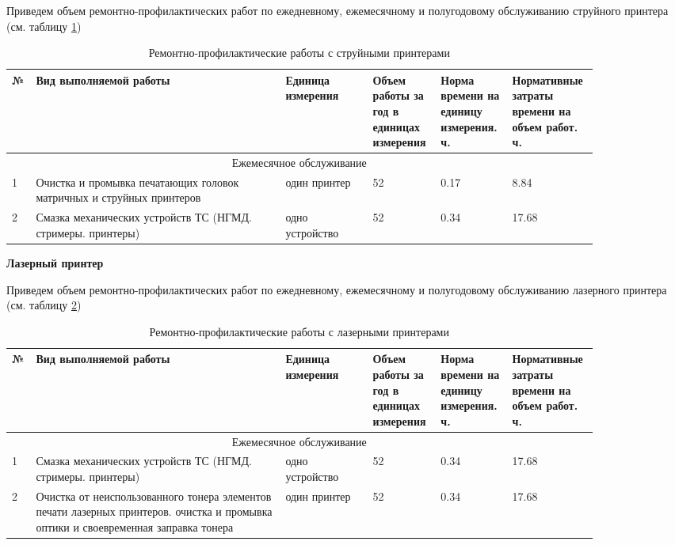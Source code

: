 \documentclass[a4paper,14pt]{extarticle}
\begin{document}
Приведем объем ремонтно-профилактических работ по ежедневному, ежемесячному и полугодовому обслуживанию струйного принтера (см. таблицу \ref{tab:ink})
\begin{table}[h!]
	\scriptsize
	\caption{Ремонтно-профилактические работы с струйными принтерами}
	\begin{tabular}{|m{0.02\linewidth}|m{0.4\linewidth}|m{0.14\linewidth}|m{0.1\linewidth}|m{0.1\linewidth}|m{0.1\linewidth}|}
		\hline
		№ & Вид выполняемой работы & Единица измерения & Объем работы за год в единицах измерения & Норма времени на единицу измерения. ч.& Нормативные затраты времени на объем работ. ч. \\\hline
		
		\multicolumn{6}{|c|}{Ежемесячное обслуживание} \\ \hline
		
		1	&Очистка и промывка печатающих головок матричных и струйных принтеров&	один принтер&	52&	0.17&	8.84
		\\ \hline
		2&	Смазка механических устройств ТС (НГМД. стримеры. принтеры)	&одно устройство&	52	&0.34&	17.68
	\\ \hline
	\end{tabular}
	\label{tab:ink}
\end{table}


\textbf{Лазерный принтер}

Приведем объем ремонтно-профилактических работ по ежедневному, ежемесячному и полугодовому обслуживанию лазерного принтера (см. таблицу \ref{tab:jet})
\begin{table}[h!]
	\scriptsize
	\caption{Ремонтно-профилактические работы с лазерными принтерами}
	\begin{tabular}{|m{0.02\linewidth}|m{0.4\linewidth}|m{0.14\linewidth}|m{0.1\linewidth}|m{0.1\linewidth}|m{0.1\linewidth}|}
		\hline
		№ & Вид выполняемой работы & Единица измерения & Объем работы за год в единицах измерения & Норма времени на единицу измерения. ч.& Нормативные затраты времени на объем работ. ч. \\\hline
		
		\multicolumn{6}{|c|}{Ежемесячное обслуживание} \\ \hline
		
		1	&Смазка механических устройств ТС (НГМД. стримеры. принтеры)&	одно устройство	&52	&0.34&	17.68
		\\ \hline
		2	&	Очистка от неиспользованного тонера элементов печати лазерных принтеров. очистка и промывка оптики и своевременная заправка тонера&	один принтер&52	&0.34&	17.68\\ \hline
		
	\end{tabular}
	\label{tab:jet}
\end{table}
\end{document}
